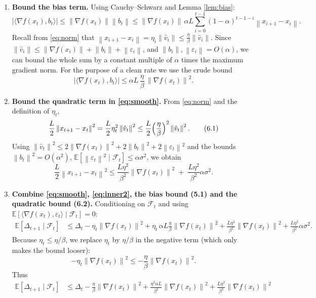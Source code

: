 \documentclass{article}
\newcommand{\E}{\mathbb{E}}
\newcommand{\norm}[1]{\left\lVert#1\right\rVert}
\begin{document}
\begin{enumerate}
\[\]
\item[Step 5.] \textbf{Bound the bias term.}
Using Cauchy–Schwarz and Lemma \ref{lem:bias}:
\[
\big|\langle\nabla f(x_t),b_t\rangle\big|
\le \norm{\nabla f(x_t)}\norm{b_t}
\le \norm{\nabla f(x_t)}\,
\alpha L\sum_{i=0}^{t-1}(1-\alpha)^{t-1-i}\norm{x_{i+1}-x_i}.
\]
Recall from \eqref{eq:norm} that $\norm{x_{i+1}-x_i}
= \eta_i\norm{\hat v_i}\le \frac{\eta}{\beta}\norm{\hat v_i}$.
Since $\norm{\hat v_i}\le \norm{\nabla f(x_i)}+\norm{b_i}+\norm{\varepsilon_i}$,
and $\norm{b_i},\norm{\varepsilon_i}=O(\alpha)$, we can bound the whole
sum by a constant multiple of $\alpha$ times the maximum gradient norm.
For the purpose of a clean rate we use the crude bound
\[
\big|\langle\nabla f(x_t),b_t\rangle\big|
\le \alpha L\,\frac{\eta}{\beta}\,\norm{\nabla f(x_t)}^{2}.
\tag{5.1}
\]
\item[Step 6.] \textbf{Bound the quadratic term in \eqref{eq:smooth}.}
From \eqref{eq:norm} and the definition of $\eta_t$,
\[
\frac{L}{2}\norm{x_{t+1}-x_t}^{2}
= \frac{L}{2}\eta_t^{2}\norm{\hat v_t}^{2}
\le \frac{L}{2}\Bigl(\frac{\eta}{\beta}\Bigr)^{2}\norm{\hat v_t}^{2}.
\tag{6.1}
\]
Using $\norm{\hat v_t}^{2}
\le 2\norm{\nabla f(x_t)}^{2}+2\norm{b_t}^{2}+2\norm{\varepsilon_t}^{2}$
and the bounds $\norm{b_t}^{2}=O(\alpha^{2})$, $\E[\norm{\varepsilon_t}^{2}\mid\mathcal{F}_{t}]\le\alpha\sigma^{2}$,
we obtain
\[
\frac{L}{2}\norm{x_{t+1}-x_t}^{2}
\le
\frac{L\eta^{2}}{\beta^{2}}\norm{\nabla f(x_t)}^{2}
\;+\;
\frac{L\eta^{2}}{\beta^{2}}\alpha\sigma^{2}.
\tag{6.2}
\]
\item[Step 7.] \textbf{Combine \eqref{eq:smooth}, \eqref{eq:inner2},
the bias bound (5.1) and the quadratic bound (6.2).}
Conditioning on $\mathcal{F}_{t}$ and using $\E[\langle\nabla f(x_t),\varepsilon_t\rangle\mid\mathcal{F}_{t}]=0$:
\begin{align}
\E[\Delta_{t+1}\mid\mathcal{F}_{t}]
&\le \Delta_t
-\eta_t\norm{\nabla f(x_t)}^{2}
+\eta_t\,\alpha L\frac{\eta}{\beta}\norm{\nabla f(x_t)}^{2}
+\frac{L\eta^{2}}{\beta^{2}}\norm{\nabla f(x_t)}^{2}
+\frac{L\eta^{2}}{\beta^{2}}\alpha\sigma^{2}. \label{eq:combine}
\end{align}
Because $\eta_t\le\eta/\beta$, we replace $\eta_t$ by $\eta/\beta$ in the
negative term (which only makes the bound looser):
\[
-\eta_t\norm{\nabla f(x_t)}^{2}\le -\frac{\eta}{\beta}\norm{\nabla f(x_t)}^{2}.
\]
Thus
\begin{align}
\E[\Delta_{t+1}\mid\mathcal{F}_{t}]
&\le \Delta_t
-\frac{\eta}{\beta}\norm{\nabla f(x_t)}^{2}
+\frac{\eta^{2}\alpha L}{\beta^{2}}\norm{\nabla f(x_t)}^{2}
+\frac{L\eta^{2}}{\beta^{2}}\norm{\nabla f(x_t)}^{2}

\end{align}
\end{enumerate}
\end{document}
